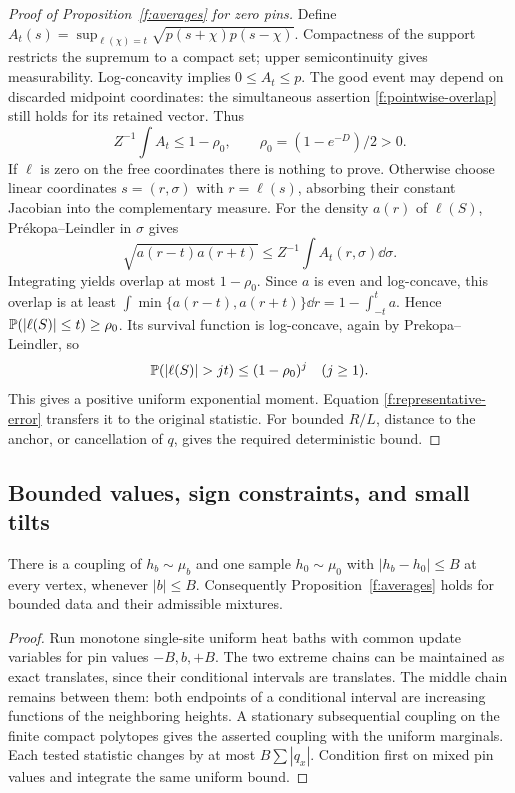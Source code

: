 \begin{proof}[Proof of Proposition~\ref{f:averages} for zero pins]
Define $A_t(s)=\sup_{\ell(\chi)=t}\sqrt{p(s+\chi)p(s-\chi)}$.
Compactness of the support restricts the supremum to a compact set;
upper semicontinuity gives measurability. Log-concavity implies
$0\le A_t\le p$. The good event may depend on discarded midpoint
coordinates: the simultaneous assertion \eqref{f:pointwise-overlap}
still holds for its retained vector. Thus
\[
 Z^{-1}\int A_t\le1-\rho_0,\qquad
 \rho_0=(1-e^{-D})/2>0.
\]
If $\ell$ is zero on the free coordinates there is nothing to prove.
Otherwise choose linear coordinates $s=(r,\sigma)$ with $r=\ell(s)$,
absorbing their constant Jacobian into the complementary measure.
For the density $a(r)$ of $\ell(S)$, Pr\'ekopa--Leindler in $\sigma$
\cite[Theorems 3 and 6]{Prekopa} gives
\[
 \sqrt{a(r-t)a(r+t)}\le Z^{-1}\int A_t(r,\sigma)\dd\sigma.
\]
Integrating yields overlap at most $1-\rho_0$. Since $a$ is even and
log-concave, this overlap is at least
$\int\min\{a(r-t),a(r+t)\}\dd r=1-\int_{-t}^t a$.
Hence $\mathbb P(|\ell(S)|\le t)\ge\rho_0$. Its survival function is
log-concave, again by Prekopa--Leindler, so
\[
 \Prob(|\ell(S)|>jt)\le(1-\rho_0)^j\quad(j\ge1).
\]
This gives a positive uniform exponential moment. Equation
\eqref{f:representative-error} transfers it to the original statistic.
For bounded $R/L$, distance to the anchor, or cancellation of $q$, gives
the required deterministic bound.
\end{proof}

\subsection{Bounded values, sign constraints, and small tilts}
\begin{lemma}\label{f:bounded}
There is a coupling of $h_b\sim\mu_b$ and one sample $h_0\sim\mu_0$ with
$|h_b-h_0|\le B$ at every vertex, whenever $|b|\le B$.
Consequently Proposition~\ref{f:averages} holds for bounded data and their
admissible mixtures.
\end{lemma}
\begin{proof}
Run monotone single-site uniform heat baths with common update variables
for pin values $-B,b,+B$. The two extreme chains can be maintained as
exact translates, since their conditional intervals are translates.
The middle chain remains between them: both endpoints of a conditional
interval are increasing functions of the neighboring heights. A stationary
subsequential coupling on the finite compact polytopes gives the asserted
coupling with the uniform marginals. Each tested statistic changes by at
most $B\sum|q_x|$. Condition first on mixed pin values and integrate the
same uniform bound.
\end{proof}


